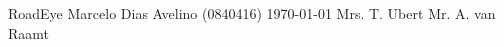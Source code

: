 \documentclass[11pt,a4paper,twoside]{report}%
\newif\ifpublic \newif\iftwocol %
\begin{document}
\titelblad                   %
  {RoadEye} %
  {Marcelo Dias Avelino (0840416)} %
  {\TI}                      %
  {\today}                   %
  {Mrs. T. Ubert}           %
  {Mr. A. van Raamt}                         %
\ifpublic
  {\footnotesize{}}
\else
  \tableofcontents         %
\fi
\ifpublic
  \iflanguage{dutch}{\def\bibname{\normalsize{Bronnen}}}
                    {\def\bibname{\normalsize{References}}}
  {\footnotesize{}}   %
\else
  \appendix
\fi
\end{document}
